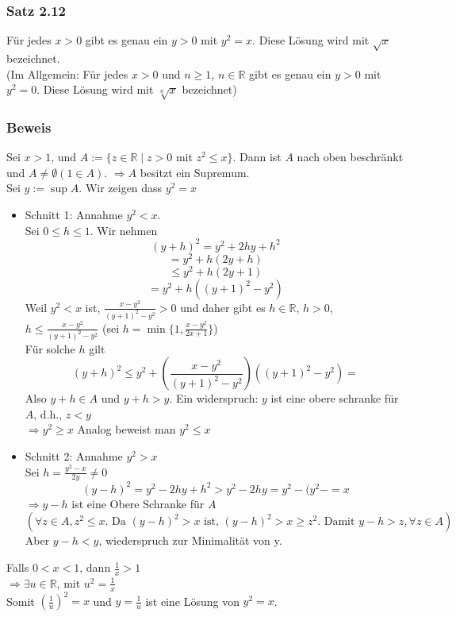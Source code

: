 \subsubsection*{Satz 2.12}
Für jedes $x>0$ gibt es genau ein $y>0$ mit $y^2=x$. Diese Lösung wird mit $\sqrt{x}$ bezeichnet.\\

(Im Allgemein: Für jedes $x>0$ und $n\geq 1$, $n\in\mathbb{R}$ gibt es genau ein $y>0$ mit $y^2=0$. Diese Lösung wird mit $\sqrt[n]{x}$ bezeichnet)
\subsubsection*{Beweis}
Sei $x>1$, und $A:=\{ z\in\mathbb{R}\mid z>0$ mit $z^2\leq x\}$. Dann ist $A$ nach oben beschränkt und $A\not=\emptyset (1\in A)$. $\Rightarrow A$ besitzt ein Supremum. \\
Sei $y:=\sup A$. Wir zeigen dass $y^2=x$
\begin{itemize}
    \item Schnitt 1: Annahme $y^2<x$. \\ 
    Sei $0\leq h\leq 1$.  Wir nehmen $$\left( y+h\right)^2=y^2+2hy+h^2$$
    $$=y^2+h(2y+h)$$
    $$\leq y^2+h(2y+1)$$
    $$=y^2 +h\left( (y+1)^2 -y^2\right)$$
    Weil $y^2<x$ ist, $\frac{x-y^2}{(y+1)^2-y^2}>0$ und daher gibt es $h\in\mathbb{R}$, $h>0$, $h\leq\frac{x-y^2}{(y+1)^2-y^2}$ (sei $h=\min \{1,\frac{x-y^2}{2x+1}\}$)\\
    
    Für solche $h$ gilt $$(y+h)^2\leq y^2 + \left( \frac{x-y^2}{(y+1)^2-y^2}\right)\left( (y+1)^2 -y^2\right)=$$ Also $y+h\in A$ und $y+h>y$. Ein widerspruch: $y$ ist eine obere schranke für $A$, d.h., $z<y$\\$\Rightarrow y^2\geq x$ Analog beweist man $y^2\leq x$
    \item Schnitt 2: Annahme $y^2>x$\\
    Sei $h=\frac{y^2-x}{2y}\not=0$ 
    $$(y-h)^2=y^2-2hy+h^2>y^2-2hy=y^2 -(y^2-=x$$
    $\Rightarrow y-h$ ist eine Obere Schranke für $A$
    $$\left( \forall z \in A, z^2\leq x\text{. Da }(y-h)^2>x \text{ ist, } (y-h)^2>x\geq z^2\text{. Damit } y-h>z, \forall z \in A\right)$$
    Aber $y-h<y$, wiederspruch zur Minimalität von y.
\end{itemize}
Falls $0<x<1$, dann $\frac{1}{x}>1$\\
$\Rightarrow \exists u\in\mathbb{R}$, mit $u^2=\frac{1}{x}$\\
Somit $\left( \frac{1}{u}\right)^2=x$ und $y=\frac{1}{u}$ ist eine Lösung von $y^2=x$.\\

